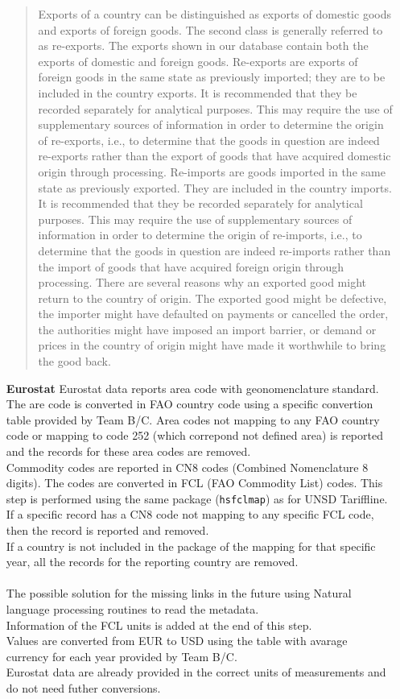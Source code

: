 \documentclass[nojss]{jss}\usepackage[]{graphicx}\usepackage[]{color}
\begin{document}
\begin{itemize}
\begin{quote}
Exports of a country can be distinguished as exports of domestic goods and exports of foreign goods. The second class is generally referred to as re-exports. The exports shown in our database contain both the exports of domestic and foreign goods. Re-exports are exports of foreign goods in the same state as previously imported; they are to be included in the country exports. It is recommended that they be recorded separately for analytical purposes. This may require the use of supplementary sources of information in order to determine the origin of re-exports, i.e., to determine that the goods in question are indeed re-exports rather than the export of goods that have acquired domestic origin through processing. Re-imports are goods imported in the same state as previously exported. They are included in the country imports. It is recommended that they be recorded separately for analytical purposes. This may require the use of supplementary sources of information in order to determine the origin of re-imports, i.e., to determine that the goods in question are indeed re-imports rather than the import of goods that have acquired foreign origin through processing. There are several reasons why an exported good might return to the country of origin. The exported good might be defective, the importer might have defaulted on payments or cancelled the order, the authorities might have imposed an import barrier, or demand or prices in the country of origin might have made it worthwhile to bring the good back.
\end{quote}

\item [\bf{Eurostat}]
Eurostat data reports area code with geonomenclature standard. The are code is converted in FAO country code using a specific convertion table provided by Team B/C.  Area codes not mapping to any FAO country code or mapping to code 252 (which correpond not defined area) is reported and the records for these area codes are removed.\\
Commodity codes are reported in CN8 codes (Combined Nomenclature 8 digits). The codes are converted in FCL (FAO Commodity List) codes. This step is performed using the same package ({\tt hsfclmap}) as for UNSD Tariffline.
If a specific record has a CN8 code not mapping to any specific FCL code, then the record is reported and removed.\\
If a country is not included in the package of the mapping for that specific year, all the records for the reporting country are removed.\\\\
The possible solution for the missing links in the future using Natural language processing routines to read the metadata.\\
Information of the FCL units is added at the end of this step.\\
Values are converted from EUR to USD using the table with avarage currency for each year provided by Team B/C.\\
Eurostat data are already provided in the correct units of measurements and do not need futher conversions.
\end{itemize}
\end{document}
